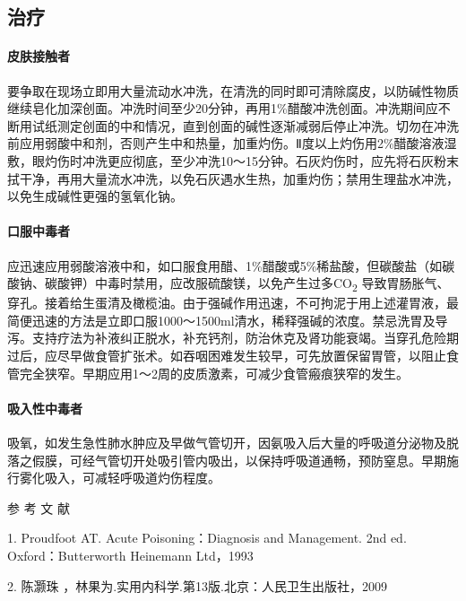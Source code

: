 \subsection{治疗}

\paragraph{皮肤接触者}

要争取在现场立即用大量流动水冲洗，在清洗的同时即可清除腐皮，以防碱性物质继续皂化加深创面。冲洗时间至少20分钟，再用1\%醋酸冲洗创面。冲洗期间应不断用试纸测定创面的中和情况，直到创面的碱性逐渐减弱后停止冲洗。切勿在冲洗前应用弱酸中和剂，否则产生中和热量，加重灼伤。Ⅱ度以上灼伤用2\%醋酸溶液湿敷，眼灼伤时冲洗更应彻底，至少冲洗10～15分钟。石灰灼伤时，应先将石灰粉末拭干净，再用大量流水冲洗，以免石灰遇水生热，加重灼伤；禁用生理盐水冲洗，以免生成碱性更强的氢氧化钠。

\paragraph{口服中毒者}

应迅速应用弱酸溶液中和，如口服食用醋、1\%醋酸或5\%稀盐酸，但碳酸盐（如碳酸钠、碳酸钾）中毒时禁用，应改服硫酸镁，以免产生过多CO\textsubscript{2}
导致胃肠胀气、穿孔。接着给生蛋清及橄榄油。由于强碱作用迅速，不可拘泥于用上述灌胃液，最简便迅速的方法是立即口服1000～1500ml清水，稀释强碱的浓度。禁忌洗胃及导泻。支持疗法为补液纠正脱水，补充钙剂，防治休克及肾功能衰竭。当穿孔危险期过后，应尽早做食管扩张术。如吞咽困难发生较早，可先放置保留胃管，以阻止食管完全狭窄。早期应用1～2周的皮质激素，可减少食管瘢痕狭窄的发生。

\paragraph{吸入性中毒者}

吸氧，如发生急性肺水肿应及早做气管切开，因氨吸入后大量的呼吸道分泌物及脱落之假膜，可经气管切开处吸引管内吸出，以保持呼吸道通畅，预防窒息。早期施行雾化吸入，可减轻呼吸道灼伤程度。

\protect\hypertarget{text00181.html}{}{}

\hypertarget{text00181.htmlux5cux23CHP5-9-3}{}
参 考 文 献

1. Proudfoot AT. Acute Poisoning：Diagnosis and Management. 2nd ed.
Oxford：Butterworth Heinemann Ltd，1993

2. 陈灏珠 ，林果为.实用内科学.第13版.北京：人民卫生出版社，2009

